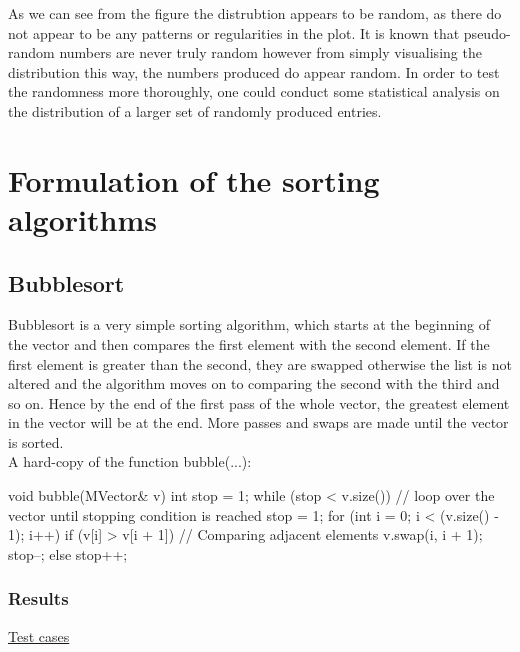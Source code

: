 \documentclass[a4paper, 12pt]{article}
\begin{document}
As we can see from the figure the distrubtion appears to be random, as there do not appear to be any patterns or regularities in the plot. It is known that pseudo-random numbers are never truly random however from simply visualising the distribution this way, the numbers produced do appear random. In order to test the randomness more thoroughly, one could conduct some statistical analysis on the distribution of a larger set of randomly produced entries. \\

\section{Formulation of the sorting algorithms}
\subsection{Bubblesort}

Bubblesort is a very simple sorting algorithm, which starts at the beginning of the vector and then compares the first element with the second element. If the first element is greater than the second, they are swapped otherwise the list is not altered and the algorithm moves on to comparing the second with the third and so on. Hence by the end of the first pass of the whole vector, the greatest element in the vector will be at the end. More passes and swaps are made until the vector is sorted. \\

A hard-copy of the function bubble(...):
\begin{spverbatim}
void bubble(MVector& v)
{
	int stop = 1;
	while (stop < v.size()) // loop over the vector until stopping condition is reached
	{
		stop = 1;
		for (int i = 0; i < (v.size() - 1); i++) 
		{
			if (v[i] > v[i + 1]) // Comparing adjacent elements
			{
				v.swap(i, i + 1); 
				stop--;
			}
			else { stop++; }
		}
	}
}
\end{spverbatim}


\subsubsection{Results}

\underline{Test cases}\\
\end{document}
